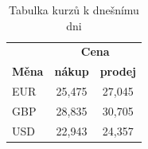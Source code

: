 \documentclass[a4paper, 11pt]{article}
\begin{document}
\vspace{10pt}

\begin{table}[h]
    \centering
    \begin{tabular}{| l | c | c |}
        \hline
        & \multicolumn{2}{c|}{\textbf{Cena}} \\ \cline{2-3}
        \textbf{Měna} & \textbf{nákup} & \textbf{prodej} \\ \hline
        EUR & 25,475 & 27,045 \\
        GBP & 28,835 & 30,705 \\
        USD	& 22,943 & 24,357 \\ \hline
    \end{tabular}
    \caption{Tabulka kurzů k dnešnímu dni}
    \label{tab2_1}
\end{table}

\vspace{10pt}
\end{document}
